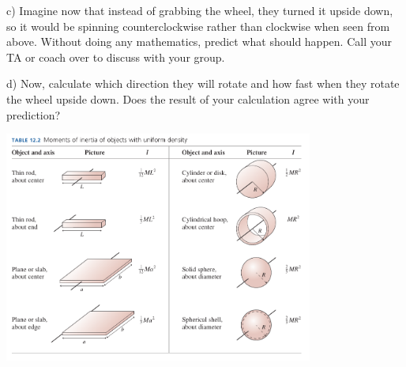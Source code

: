 \documentclass[12pt]{article}
\begin{document}
\vspace{3in}
\newpage

c) Imagine now that instead of grabbing the wheel, they turned it upside down, so it would be spinning counterclockwise rather than clockwise when seen from above. Without doing any mathematics, predict what should happen. Call your TA or coach over to discuss with your group.

\vspace{2in}

d) Now, calculate which direction they will rotate and how fast when they rotate the wheel upside down. Does the result of your calculation agree with your prediction?
\vfill

\begin{center}
	\includegraphics[width=4in]{moment-table.png}
\end{center}

\newpage
\end{document}
